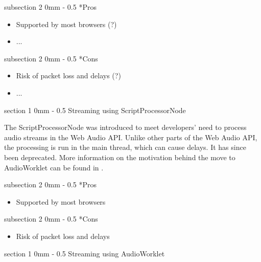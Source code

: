 \documentclass[11pt, a4paper, twoside]{article}
\makeatletter
\renewcommand{\subsection}{\@startsection
   {subsection}%
   {2}%
   {0mm}%
   {-\baselineskip}%
   {0.5\baselineskip}%
   {\bfseries\sffamily\large}}%
\renewcommand{\section}{\@startsection
   {section}%
   {1}%
   {0mm}%
   {-\baselineskip}%
   {0.5\baselineskip}%
   {\bfseries\sffamily\Large}}%
\makeatother
\begin{document}
\subsection*{Pros}
\begin{itemize}
\item Supported by most browsers (?)
\item ...
  \end{itemize}

\subsection*{Cons}
\begin{itemize}
\item Risk of packet loss and delays (?)
\item ...
\end{itemize}

\section{Streaming using ScriptProcessorNode}

The ScriptProcessorNode\cite{scriptprocessornode} was introduced to meet developers' need to process audio streams in the Web Audio API. Unlike other parts of the Web Audio API, the processing is run in the main thread, which can cause delays. It has since been deprecated. More information on the motivation behind the move to AudioWorklet can be found in \cite{icmc}.

\subsection*{Pros}
\begin{itemize}
\item Supported by most browsers
  \end{itemize}

\subsection*{Cons}
\begin{itemize}
\item Risk of packet loss and delays
\end{itemize}


\section{Streaming using AudioWorklet}
\end{document}
